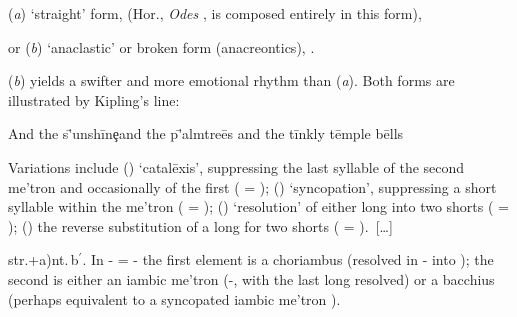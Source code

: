\documentclass[11pt]{report}
\newcommand{\Greek}[1]{\bgroup\fontencoding{OT1}\greek #1\egroup}
\renewcommand{\(}{\begin{metrike}}
\renewcommand{\)}{\end{metrike}}
\begin{document}
\begin{list}{}{}
%
\item[(\textit{a})] `straight' form, \metra{\b\b\m\m \c \b\b\m\m}
(Hor., \textit{Odes} ,  is composed
entirely in this form),
%
\item[or (\textit{b})] `anaclastic' or broken form (anacreontics),
\metra{\b\b\m\b\c\m\b\m\m}.
\end{list}
%
(\textit{b}) yields a swifter and more emotional rhythm than
(\textit{a}). Both forms are illustrated by Kipling's line:\par
\begin{metrica}
\-And th\-e s\='unsh\=ine\c \-and th\-e p\='almtre\=es \-and th\-e
t\=inkl\-y t\=empl\-e b\=ells\ \metra[\m{-2}\ss{1.225}\ms{st}]{\K\m}%
\end{metrica}\par
Variations include () `catal\=exis', suppressing the
last syllable of the second \Greek{me'tron} and occasionally of the
first ( = \metra{\b\b\m\k\m \c \b\b\m\k\m});
() `syncopation', suppressing a short syllable within
the \Greek{me'tron} ( = \metra{\b\b\m\b\c\m\p\m\m});
() `resolution' of either long into two shorts
( = \metra{\b\b\bb\m\c\b\b\m\m}); ()
the reverse substitution of a long for two shorts
( = \metra{\m\m\m\c\b\b\m\m}).\ [\ldots]

\Greek{str.}+\Greek{a)nt.\,b}$^\prime$. In %
- = - the first
element is a choriambus \metra{\m\b\b\m} (resolved in
- into \metra{\bb\b\b\bb}); the
second is either an iambic \Greek{me'tron}
(-, with the last long resolved)
or a bacchius \metra{\b\m\m} (perhaps equivalent to a syncopated
iambic \Greek{me'tron} \metra{\b\m\p\m}). 
\end{document}
